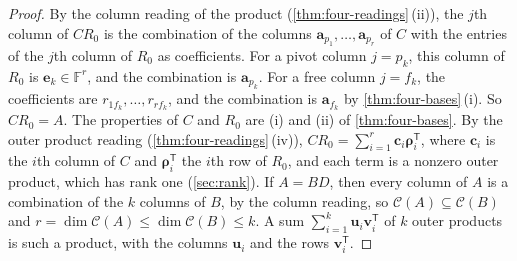 \begin{proof}
By the column reading of the product (\cref{thm:four-readings}\,(ii)), the $j$th column of $CR_0$ is the combination of the columns $\mathbf a_{p_1},\ldots,\mathbf a_{p_r}$ of $C$ with the entries of the $j$th column of $R_0$ as coefficients. For a pivot column $j=p_k$, this column of $R_0$ is $\mathbf e_k\in\mathbb F^r$, and the combination is $\mathbf a_{p_k}$. For a free column $j=f_k$, the coefficients are $r_{1f_k},\ldots,r_{rf_k}$, and the combination is $\mathbf a_{f_k}$ by \cref{thm:four-bases}\,(i). So $CR_0=A$. The properties of $C$ and $R_0$ are (i) and (ii) of \cref{thm:four-bases}. By the outer product reading (\cref{thm:four-readings}\,(iv)), $CR_0=\sum_{i=1}^r\mathbf c_i\boldsymbol\rho_i^{\mathsf T}$, where $\mathbf c_i$ is the $i$th column of $C$ and $\boldsymbol\rho_i^{\mathsf T}$ the $i$th row of $R_0$, and each term is a nonzero outer product, which has rank one (\cref{sec:rank}). If $A=BD$, then every column of $A$ is a combination of the $k$ columns of $B$, by the column reading, so $\mathcal C(A)\subseteq\mathcal C(B)$ and $r=\dim\mathcal C(A)\le\dim\mathcal C(B)\le k$. A sum $\sum_{i=1}^k\mathbf u_i\mathbf v_i^{\mathsf T}$ of $k$ outer products is such a product, with the columns $\mathbf u_i$ and the rows $\mathbf v_i^{\mathsf T}$.
\end{proof}

